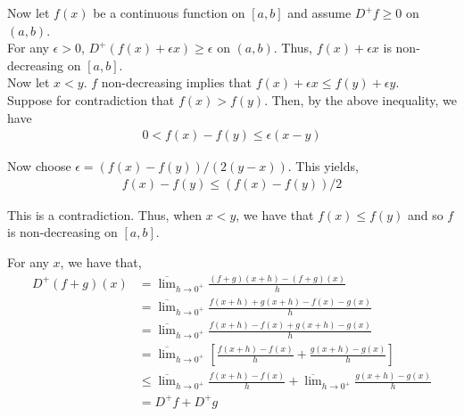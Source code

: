 \documentclass[12pt]{article}
\newenvironment{problem}[2][Problem]{\begin{trivlist}
\item[\hskip \labelsep {\bfseries #1}\hskip \labelsep {\bfseries #2.}]}{\end{trivlist}}
\begin{document}
Now let $f(x)$ be a continuous function on $[a, b]$ and assume $D^+f \geq 0$ on $(a, b)$.\\

For any $\epsilon > 0$, $D^+(f(x) + \epsilon x) \geq \epsilon$ on $(a, b)$. Thus, $f(x) + \epsilon x$ is non-decreasing on $[a, b]$.\\

Now let $x < y$. $f$ non-decreasing implies that $f(x) + \epsilon x \leq f(y) + \epsilon y$.\\

Suppose for contradiction that $f(x) > f(y)$. Then, by the above inequality, we have
\begin{align*}
0 < f(x) - f(y) \leq \epsilon(x - y)
\end{align*}

Now choose $\epsilon = (f(x) - f(y))/(2(y-x))$. This yields,
\begin{align*}
f(x) - f(y) \leq (f(x) - f(y))/2
\end{align*}

This is a contradiction. Thus, when $x < y$, we have that $f(x) \leq f(y)$ and so $f$ is non-decreasing on $[a, b]$.

\begin{problem}{4}
\end{problem}

For any $x$, we have that,
\begin{align*}
D^+(f+g)(x) &= \overline{\lim}_{h \to 0^+} \frac{(f+g)(x+h) - (f+g)(x)}{h}\\
&= \overline{\lim}_{h \to 0^+} \frac{f(x+h) + g(x+h) - f(x) - g(x)}{h}\\
&= \overline{\lim}_{h \to 0^+} \frac{f(x+h) - f(x) + g(x+h) - g(x)}{h}\\
&= \overline{\lim}_{h \to 0^+} \left[\frac{f(x+h) - f(x)}{h} + \frac{g(x+h) - g(x)}{h}\right]\\
&\leq \overline{\lim}_{h \to 0^+} \frac{f(x+h) - f(x)}{h} + \overline{\lim}_{h \to 0^+} \frac{g(x+h) - g(x)}{h}\\
&= D^+f + D^+g
\end{align*}
\end{document}
